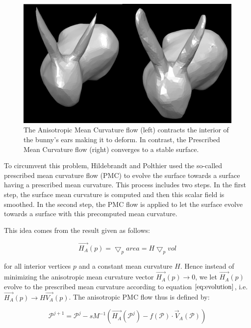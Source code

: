 \documentclass[11pt]{article}
\begin{document}
\begin{figure}[htb]
\centering
\includegraphics[width=\textwidth]{amc_pmc.png}
\caption{The Anisotropic Mean Curvature flow (left) contracts the interior of the bunny's ears making it to deform. In contrast, the Prescribed Mean Curvature flow (right) converges to a stable surface.}
\label{fig:amc_pmc}
\end{figure}

To circumvent this problem, Hildebrandt and Polthier \cite{Hildebrandt04anisotropicfiltering} used the so-called prescribed mean curvature flow (PMC) to evolve the surface towards a surface having a prescribed mean curvature. This process includes two steps. In the first step, the surface mean curvature is computed and then this scalar field is smoothed. In the second step, the PMC flow is applied to let the surface evolve towards a surface with this precomputed mean curvature. 

This idea comes from the result \cite{PolthierRossmann2002} given as follows:

\begin{equation}
\vec{H_A}(p) = \bigtriangledown_p area = H \bigtriangledown_p vol
\label{eq:evolution}
\end{equation}

for all interior vertices $p$ and a constant mean curvature $H$. Hence instead of minimizing the anisotropic mean curvature vector $\vec{H_A}(p) \rightarrow 0$, we let $\vec{H_A}(p)$ evolve to the prescribed mean curvature according to equation $\ref{eq:evolution}$, i.e. $\vec{H_A}(p) \rightarrow H\vec{V_A}(p)$. The anisotropic PMC flow thus is defined by:

\begin{equation}
\mathcal{P}^{j+1} = \mathcal{P}^j -sM^{-1}(\vec{H_A}(\mathcal{P}^j) - f(\mathcal{P}) \cdot \vec{V}_A(\mathcal{P}))
\end{equation}
\end{document}
